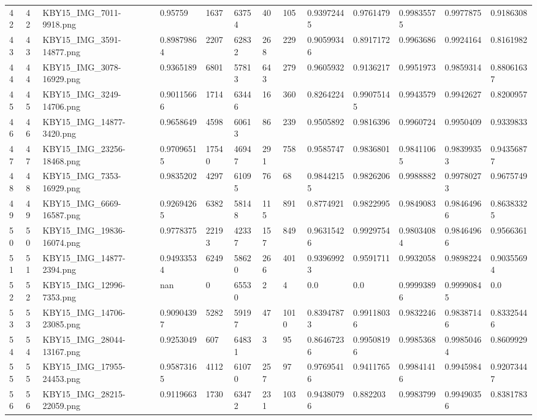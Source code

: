 \documentclass[11pt, a4paper, twoside]{report}
\begin{document}
\begin{longtable}[c]{@{}lllllllllllll@{}}
42 & 42 & KBY15\_IMG\_7011-9918.png & 0.95759 & 1637 & 63754 & 40 & 105 & 0.93972445 & 0.9761479 & 0.99835575 & 0.9977875 & 0.9186308 \\
43 & 43 & KBY15\_IMG\_3591-14877.png & 0.89879864 & 2207 & 62832 & 268 & 229 & 0.90599346 & 0.8917172 & 0.9963686 & 0.9924164 & 0.8161982 \\
44 & 44 & KBY15\_IMG\_3078-16929.png & 0.9365189 & 6801 & 57813 & 643 & 279 & 0.9605932 & 0.9136217 & 0.9951973 & 0.9859314 & 0.88061637 \\
45 & 45 & KBY15\_IMG\_3249-14706.png & 0.90115666 & 1714 & 63446 & 16 & 360 & 0.8264224 & 0.99075145 & 0.9943579 & 0.9942627 & 0.8200957 \\
46 & 46 & KBY15\_IMG\_14877-3420.png & 0.9658649 & 4598 & 60613 & 86 & 239 & 0.9505892 & 0.9816396 & 0.9960724 & 0.9950409 & 0.9339833 \\
47 & 47 & KBY15\_IMG\_23256-18468.png & 0.97096515 & 17540 & 46947 & 291 & 758 & 0.9585747 & 0.9836801 & 0.98411065 & 0.98399353 & 0.94356877 \\
48 & 48 & KBY15\_IMG\_7353-16929.png & 0.9835202 & 4297 & 61095 & 76 & 68 & 0.98442155 & 0.9826206 & 0.9988882 & 0.99780273 & 0.9675749 \\
49 & 49 & KBY15\_IMG\_6669-16587.png & 0.92694265 & 6382 & 58148 & 115 & 891 & 0.8774921 & 0.9822995 & 0.9849083 & 0.98464966 & 0.86383325 \\
50 & 50 & KBY15\_IMG\_19836-16074.png & 0.9778375 & 22193 & 42337 & 157 & 849 & 0.96315426 & 0.9929754 & 0.98034084 & 0.98464966 & 0.9566361 \\
51 & 51 & KBY15\_IMG\_14877-2394.png & 0.94933534 & 6249 & 58620 & 266 & 401 & 0.93969923 & 0.9591711 & 0.9932058 & 0.9898224 & 0.90355694 \\
52 & 52 & KBY15\_IMG\_12996-7353.png & nan & 0 & 65530 & 2 & 4 & 0.0 & 0.0 & 0.99993896 & 0.99990845 & 0.0 \\
53 & 53 & KBY15\_IMG\_14706-23085.png & 0.90904397 & 5282 & 59197 & 47 & 1010 & 0.83947873 & 0.99118036 & 0.9832246 & 0.98387146 & 0.83325446 \\
54 & 54 & KBY15\_IMG\_28044-13167.png & 0.9253049 & 607 & 64831 & 3 & 95 & 0.86467236 & 0.99508196 & 0.9985368 & 0.99850464 & 0.8609929 \\
55 & 55 & KBY15\_IMG\_17955-24453.png & 0.95873165 & 4112 & 61070 & 257 & 97 & 0.97695416 & 0.9411765 & 0.99841416 & 0.9945984 & 0.92073447 \\
56 & 56 & KBY15\_IMG\_28215-22059.png & 0.9119663 & 1730 & 63472 & 231 & 103 & 0.94380796 & 0.882203 & 0.9983799 & 0.99490356 & 0.8381783 \\

\end{longtable}
\end{document}
